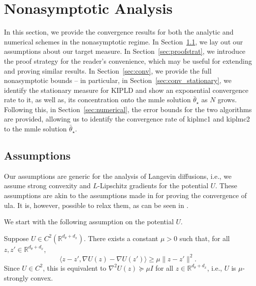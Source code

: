 
\section{Nonasymptotic Analysis}\label{sec:nonasymp}

In this section, we provide the convergence results for both the analytic and numerical schemes in the nonasymptotic regime. In Section~\ref{sec:assumptions}, we lay out our assumptions about our target measure. In Section~\ref{sec:proofstrat}, we introduce the proof strategy for the reader's convenience, which may be useful for extending and proving similar results. In Section~\ref{sec:conv}, we provide the full nonasymptotic bounds -- in particular, in Section~\ref{sec:conv_stationary}, we identify the stationary measure for KIPLD and show an exponential convergence rate to it, as well as, its concentration onto the \gls*{mmle} solution $\bar{\theta}_\star$ as $N$ grows. Following this, in Section~\ref{sec:numerical}, the error bounds for the two algorithms are provided, allowing us to identify the convergence rate of \gls*{kiplmc1} and \gls*{kiplmc2} to the \gls*{mmle} solution $\bar{\theta}_\star$.

\subsection{Assumptions}\label{sec:assumptions}
Our assumptions are generic for the analysis of Langevin diffusions, i.e., we assume strong convexity and $L$-Lipschitz gradients for the potential $U$. These assumptions are akin to the assumptions made in \citep{durmus2017nonasymptotic,dalalyan2017theoretical,dalalyan2019user} for proving the convergence of \gls*{ula}. It is, however, possible to relax them, as can be seen in \citep{zhang2023nonasymptotic,akyildiz2024nonasymptotic}.

We start with the following assumption on the potential $U$.
\begin{assumption}\label{assump:strongconvexity}
Suppose $U\in C^2(\mathbb{R}^{d_\theta+d_x})$. There exists a constant $\mu>0$ such that, for all $z,z'\in \mathbb{R}^{d_\theta+d_x}$,
\begin{equation*}
\langle z-z', \nabla U(z) - \nabla U(z')\rangle \geq \mu \|z-z'\|^2.
\end{equation*}
Since $U\in C^2$, this is equivalent to $\nabla^2 U(z)\succeq \mu I$ for all $z\in \mathbb{R}^{d_\theta+d_x}$, i.e., $U$ is $\mu$-strongly convex.
\end{assumption}

